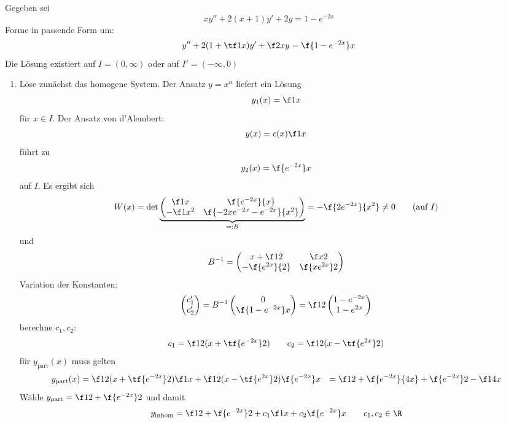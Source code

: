 \begin{ex} \label{4.7}
	Gegeben sei
	\[
		xy'' + 2(x+1)y' + 2y = 1 - e^{-2x}
	\]
	Forme in passende Form um:
	\[
		y'' + 2(1+\tf 1x) y' + \f 2x y = \f {1-e^{-2x}}x
	\]
	Die Lösung existiert auf $I = (0,\infty)$ oder auf $I' = (-\infty,0)$
	\begin{enumerate}[1)]
		\item
			Löse zunächst das homogene System.
			Der Ansatz $y = x^{\alpha}$ liefert ein Lösung
			\[
				y_1(x) = \f 1 x
			\]
			für $x \in I$.
			Der Ansatz von d'Alembert:
			\[
				y(x) = c(x) \f 1x
			\]
			führt zu
			\[
				y_2(x) = \f {e^{-2x}}x
			\]
			auf $I$.
			Es ergibt sich
			\[
				W(x) = \det \underbrace{\begin{pmatrix}
					\f 1x & \f {e^{-2x}}{x} \\
					- \f 1{x^2} & \f {-2xe^{-2x}-e^{-2x}}{x^2}
				\end{pmatrix}}_{=:B} = - \f {2e^{-2x}}{x^2} \neq 0 \qquad \text{(auf $I$)}
			\]
			und
			\[
				B^{-1} = \begin{pmatrix}
					x+\f 12 & \f x2 \\
					-\f {e^{2x}}{2} & \f {xe^{2x}}2
				\end{pmatrix}
			\]
			Variation der Konstanten:
			\[
				\begin{pmatrix}
					c_1' \\ c_2'
				\end{pmatrix} = B^{-1} \begin{pmatrix}
					0 \\ \f {1-e^{-2x}}x
				\end{pmatrix} = \f 12 \begin{pmatrix}
					1 - e^{-2x} \\ 1 - e^{2x}
				\end{pmatrix}
			\]
			berechne $c_1, c_2$:
			\[
				c_1 = \f 12 (x + \tf {e^{-2x}}2)
				\qquad
				c_2 = \f 12 (x - \tf {e^{2x}}2)
			\]
			für $y_{\text{part}} (x)$ muss gelten
			\begin{align*}
				y_{\text{part}} (x) &= \f 12 (x + \tf{e^{-2x}}2)\f 1x + \f 12 (x - \tf {e^{2x}}2) \f {e^{-2x}}x
				&= \f 12 + \f {e^{-2x}}{4x} + \f {e^{-2x}}2 - \f 1{4x}
			\end{align*}
			Wähle $y_{\text{part}} = \f 12 + \f {e^{-2x}}2$ und damit
			\[
				y_{\text{inhom}} = \f 12 + \f {e^{-2x}}2 + c_1 \f 1x + c_2 \f {e^{-2x}}x
				\qquad
				c_1, c_2 \in \R
			\]
	\end{enumerate}
\end{ex}


